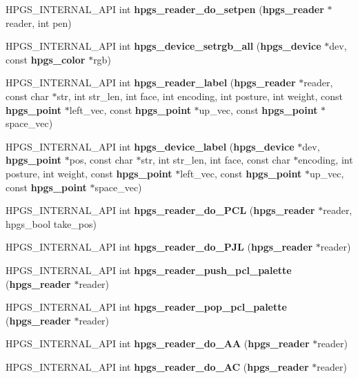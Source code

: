 \begin{DoxyCompactItemize}
\item 
HPGS\_\-INTERNAL\_\-API int {\bfseries hpgs\_\-reader\_\-do\_\-setpen} ({\bf hpgs\_\-reader} $\ast$reader, int pen)\label{group__reader_gaec59e9a64adea9ff35c300bdcdf71ede}

\item 
HPGS\_\-INTERNAL\_\-API int {\bf hpgs\_\-device\_\-setrgb\_\-all} ({\bf hpgs\_\-device} $\ast$dev, const {\bf hpgs\_\-color} $\ast$rgb)
\item 
HPGS\_\-INTERNAL\_\-API int {\bfseries hpgs\_\-reader\_\-label} ({\bf hpgs\_\-reader} $\ast$reader, const char $\ast$str, int str\_\-len, int face, int encoding, int posture, int weight, const {\bf hpgs\_\-point} $\ast$left\_\-vec, const {\bf hpgs\_\-point} $\ast$up\_\-vec, const {\bf hpgs\_\-point} $\ast$space\_\-vec)\label{group__reader_gac6c23c56f2bee0cabc2492a6438abcda}

\item 
HPGS\_\-INTERNAL\_\-API int {\bfseries hpgs\_\-device\_\-label} ({\bf hpgs\_\-device} $\ast$dev, {\bf hpgs\_\-point} $\ast$pos, const char $\ast$str, int str\_\-len, int face, const char $\ast$encoding, int posture, int weight, const {\bf hpgs\_\-point} $\ast$left\_\-vec, const {\bf hpgs\_\-point} $\ast$up\_\-vec, const {\bf hpgs\_\-point} $\ast$space\_\-vec)\label{group__reader_gafd1779b4aa12943dfa10be814af2e3dd}

\item 
HPGS\_\-INTERNAL\_\-API int {\bf hpgs\_\-reader\_\-do\_\-PCL} ({\bf hpgs\_\-reader} $\ast$reader, hpgs\_\-bool take\_\-pos)
\item 
HPGS\_\-INTERNAL\_\-API int {\bf hpgs\_\-reader\_\-do\_\-PJL} ({\bf hpgs\_\-reader} $\ast$reader)
\item 
HPGS\_\-INTERNAL\_\-API int {\bfseries hpgs\_\-reader\_\-push\_\-pcl\_\-palette} ({\bf hpgs\_\-reader} $\ast$reader)\label{group__reader_ga294cc9935b4d62e164171d27c0d81075}

\item 
HPGS\_\-INTERNAL\_\-API int {\bfseries hpgs\_\-reader\_\-pop\_\-pcl\_\-palette} ({\bf hpgs\_\-reader} $\ast$reader)\label{group__reader_gae17b8b5957ffe80f51220b6efbe8e6f2}

\item 
HPGS\_\-INTERNAL\_\-API int {\bfseries hpgs\_\-reader\_\-do\_\-AA} ({\bf hpgs\_\-reader} $\ast$reader)\label{group__reader_ga9a0a45b19f07f96bef55ddee09cdeea2}

\item 
HPGS\_\-INTERNAL\_\-API int {\bfseries hpgs\_\-reader\_\-do\_\-AC} ({\bf hpgs\_\-reader} $\ast$reader)\label{group__reader_ga20467dca742ce723837376425e024f8d}


\end{DoxyCompactItemize}
